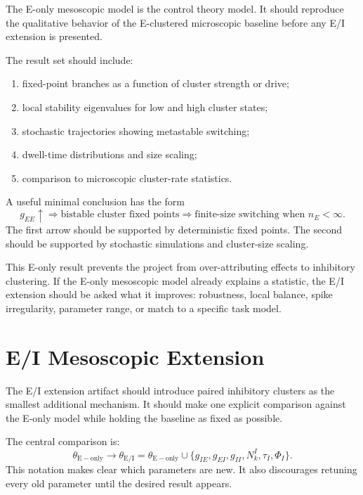 The E-only mesoscopic model is the control theory model. It should reproduce the qualitative behavior of the E-clustered microscopic baseline before any E/I extension is presented.

The result set should include:
%
\begin{enumerate}[leftmargin=*]
  \item fixed-point branches as a function of cluster strength or drive;
  \item local stability eigenvalues for low and high cluster states;
  \item stochastic trajectories showing metastable switching;
  \item dwell-time distributions and size scaling;
  \item comparison to microscopic cluster-rate statistics.
\end{enumerate}

A useful minimal conclusion has the form
%
\begin{equation}
  g_{EE}\uparrow
  \Rightarrow
  \text{bistable cluster fixed points}
  \Rightarrow
  \text{finite-size switching when } n_E<\infty .
  \label{eq:e-only-result-chain}
\end{equation}
%
The first arrow should be supported by deterministic fixed points. The second should be supported by stochastic simulations and cluster-size scaling.

This E-only result prevents the project from over-attributing effects to inhibitory clustering. If the E-only mesoscopic model already explains a statistic, the E/I extension should be asked what it improves: robustness, local balance, spike irregularity, parameter range, or match to a specific task model.

\section{E/I Mesoscopic Extension}
\label{sec:ei-mesoscopic-extension-artifact}

The E/I extension artifact should introduce paired inhibitory clusters as the smallest additional mechanism. It should make one explicit comparison against the E-only model while holding the baseline as fixed as possible.

The central comparison is:
%
\begin{equation}
  \theta_{\mathrm{E-only}}
  \longrightarrow
  \theta_{\mathrm{E/I}}
  =
  \theta_{\mathrm{E-only}}
  \cup
  \{g_{IE},g_{EI},g_{II},N_k^I,\tau_I,\Phi_I\}.
  \label{eq:ei-extension-parameter-addition}
\end{equation}
%
This notation makes clear which parameters are new. It also discourages retuning every old parameter until the desired result appears.

